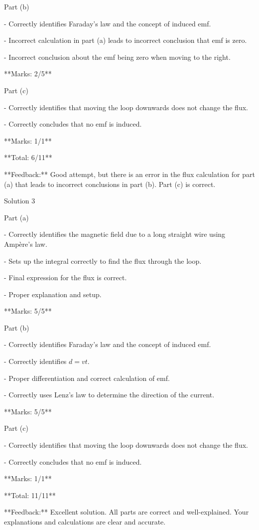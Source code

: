 \documentclass[a4paper,11pt]{article}
\begin{document}
Part (b)

- Correctly identifies Faraday's law and the concept of induced emf.

- Incorrect calculation in part (a) leads to incorrect conclusion that emf is zero.

- Incorrect conclusion about the emf being zero when moving to the right.

**Marks: 2/5**

Part (c)

- Correctly identifies that moving the loop downwards does not change the flux.

- Correctly concludes that no emf is induced.

**Marks: 1/1**

**Total: 6/11**

**Feedback:** Good attempt, but there is an error in the flux calculation for part (a) that leads to incorrect conclusions in part (b). Part (c) is correct.

Solution 3

Part (a)

- Correctly identifies the magnetic field due to a long straight wire using Ampère's law.

- Sets up the integral correctly to find the flux through the loop.

- Final expression for the flux is correct.

- Proper explanation and setup.

**Marks: 5/5**

Part (b)

- Correctly identifies Faraday's law and the concept of induced emf.

- Correctly identifies \( d = vt \).

- Proper differentiation and correct calculation of emf.

- Correctly uses Lenz's law to determine the direction of the current.

**Marks: 5/5**

Part (c)

- Correctly identifies that moving the loop downwards does not change the flux.

- Correctly concludes that no emf is induced.

**Marks: 1/1**

**Total: 11/11**

**Feedback:** Excellent solution. All parts are correct and well-explained. Your explanations and calculations are clear and accurate.
\end{document}
